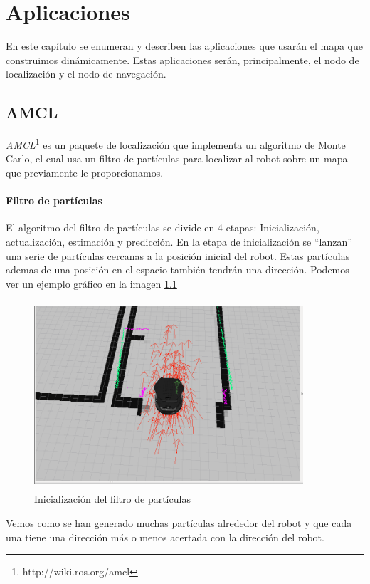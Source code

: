 \chapter{Aplicaciones}
\label{cap:aplicaciones}

En este capítulo se enumeran y describen las aplicaciones que usarán el mapa que construimos dinámicamente. Estas aplicaciones serán, principalmente, el nodo de localización y el nodo de navegación.



\section{AMCL}
\label{sec:amcl}
\textit{AMCL}\footnote{http://wiki.ros.org/amcl} es un paquete de localización que implementa un algoritmo de Monte Carlo, el cual usa un filtro de partículas para localizar al robot sobre un mapa que previamente le proporcionamos.
\subsubsection{Filtro de partículas}
El algoritmo del filtro de partículas se divide en 4 etapas: Inicialización, actualización, estimación y predicción. 
En la etapa de inicialización se ``lanzan'' una serie de partículas cercanas a la posición inicial del robot. Estas partículas ademas de una posición en el espacio también tendrán una dirección. Podemos ver un ejemplo gráfico en la imagen \ref{fig:initamcl}

\begin{figure}[hbtp]
  \begin{center}
    \includegraphics[width=10cm,height=7cm]{img/cap5/initamcl}
  \end{center}
  \caption{Inicialización del filtro de partículas}
  \label{fig:initamcl}
\end{figure}
Vemos como se han generado muchas partículas alrededor del robot y que cada una tiene una dirección más o menos acertada con la dirección del robot.

